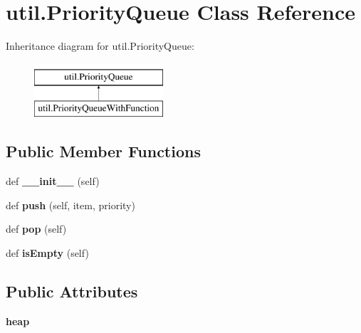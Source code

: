 \hypertarget{classutil_1_1_priority_queue}{}\section{util.\+Priority\+Queue Class Reference}
\label{classutil_1_1_priority_queue}
Inheritance diagram for util.\+Priority\+Queue\+:\begin{figure}[H]
\begin{center}
\leavevmode
\includegraphics[height=2.000000cm]{classutil_1_1_priority_queue}
\end{center}
\end{figure}
\subsection*{Public Member Functions}
\begin{DoxyCompactItemize}
\item 
\mbox{\label{classutil_1_1_priority_queue_a0106af676796b4ebc48d6260867533d9}} 
def {\bfseries \+\_\+\+\_\+init\+\_\+\+\_\+} (self)
\item 
\mbox{\label{classutil_1_1_priority_queue_a57a348c6571b80ac89d401af27c9bb31}} 
def {\bfseries push} (self, item, priority)
\item 
\mbox{\label{classutil_1_1_priority_queue_a7bfd9bfe51ecada957b3bb69c638e41c}} 
def {\bfseries pop} (self)
\item 
\mbox{\label{classutil_1_1_priority_queue_a7e9393829a3f71d06be25595e80c7be9}} 
def {\bfseries is\+Empty} (self)
\end{DoxyCompactItemize}
\subsection*{Public Attributes}
\begin{DoxyCompactItemize}
\item 
\mbox{\label{classutil_1_1_priority_queue_a06389a4f3b391e387758f633c15950e8}} 
{\bfseries heap}
\end{DoxyCompactItemize}



